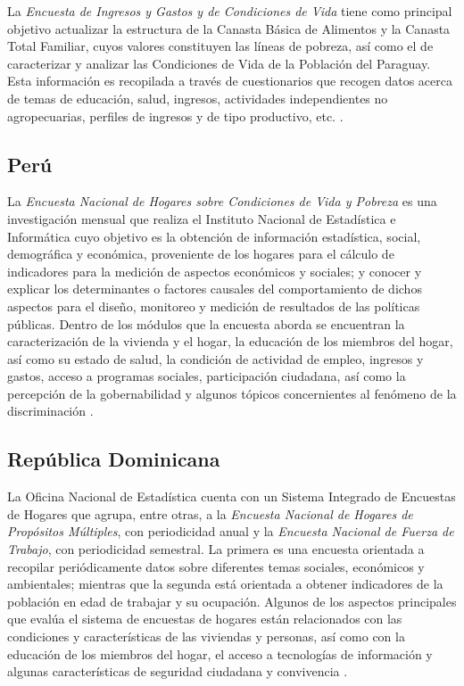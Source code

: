 \documentclass[12pt,spanish,]{book}
\begin{document}
La \emph{Encuesta de Ingresos y Gastos y de Condiciones de Vida} tiene como principal objetivo actualizar la estructura de la Canasta Básica de Alimentos y la Canasta Total Familiar, cuyos valores constituyen las líneas de pobreza, así como el de caracterizar y analizar las Condiciones de Vida de la Población del Paraguay. Esta información es recopilada a través de cuestionarios que recogen datos acerca de temas de educación, salud, ingresos, actividades independientes no agropecuarias, perfiles de ingresos y de tipo productivo, etc. \autocite{DGEEC2-PY}.

\hypertarget{peru}{%
\subsection*{Perú}\label{peru}}

La \emph{Encuesta Nacional de Hogares sobre Condiciones de Vida y Pobreza} es una investigación mensual que realiza el Instituto Nacional de Estadística e Informática cuyo objetivo es la obtención de información estadística, social, demográfica y económica, proveniente de los hogares para el cálculo de indicadores para la medición de aspectos económicos y sociales; y conocer y explicar los determinantes o factores causales del comportamiento de dichos aspectos para el diseño, monitoreo y medición de resultados de las políticas públicas. Dentro de los módulos que la encuesta aborda se encuentran la caracterización de la vivienda y el hogar, la educación de los miembros del hogar, así como su estado de salud, la condición de actividad de empleo, ingresos y gastos, acceso a programas sociales, participación ciudadana, así como la percepción de la gobernabilidad y algunos tópicos concernientes al fenómeno de la discriminación \autocite{INEI-PE_2016}.

\hypertarget{republica-dominicana}{%
\subsection*{República Dominicana}\label{republica-dominicana}}

La Oficina Nacional de Estadística cuenta con un Sistema Integrado de Encuestas de Hogares que agrupa, entre otras, a la \emph{Encuesta Nacional de Hogares de Propósitos Múltiples}, con periodicidad anual y la \emph{Encuesta Nacional de Fuerza de Trabajo}, con periodicidad semestral. La primera es una encuesta orientada a recopilar periódicamente datos sobre diferentes temas sociales, económicos y ambientales; mientras que la segunda está orientada a obtener indicadores de la población en edad de trabajar y su ocupación. Algunos de los aspectos principales que evalúa el sistema de encuestas de hogares están relacionados con las condiciones y características de las viviendas y personas, así como con la educación de los miembros del hogar, el acceso a tecnologías de información y algunas características de seguridad ciudadana y convivencia \autocite{ONE-DO}.
\end{document}

